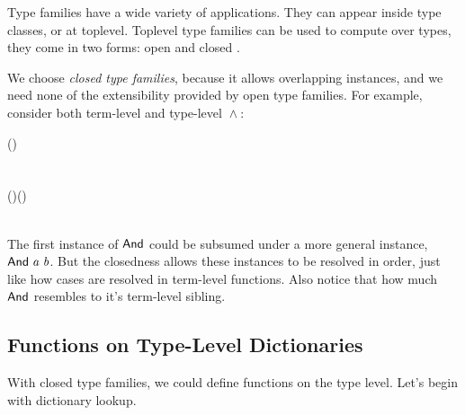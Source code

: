 Type families have a wide variety of applications. They can appear inside type
 classes\cite{tfclass,tfsynonym}, or at toplevel. Toplevel type families
 can be used to compute over types, they come in two forms: open\cite{tfopen}
 and closed \cite{tfclosed}.

We choose \emph{closed type families}, because it allows overlapping instances,
 and we need none of the extensibility provided by open type families.
For example, consider both term-level and type-level \ensuremath{\mathrel{\wedge}}:

\begin{hscode}\SaveRestoreHook
{}%
%
%
%
%
%
\>[B]{}(\mathrel{\wedge})\mathbin{::}\to {}\to {}\<[E]%
\\
\>[B]{}\mathrel{\wedge}\mathrel{=}\<[E]%
\\
\>[B]{}\<[6]%
\>[6]{}\mathrel{\wedge}\<[14]%
\>[14]{}\mathrel{=}\<[E]%
\\[\blanklineskip]%
\>[B]{}\;\;\;(\mathbin{::})\;(\mathbin{::})\mathbin{::}\;\<[E]%
\\
\>[B]{}\<[5]%
\>[5]{}\;\;\mathrel{=}\<[E]%
\\
\>[B]{}\<[5]%
\>[5]{}\;\;{}\<[14]%
\>[14]{}\<[19]%
\>[19]{}\mathrel{=}\<[E]%
\ColumnHook
\end{hscode}\resethooks

The first instance of \ensuremath{\Conid{And}} could be subsumed under a more
 general instance, \ensuremath{\Conid{And}\;\Varid{a}\;\Varid{b}}.
But the closedness allows these instances to be resolved in order, just like
 how cases are resolved in term-level functions. Also notice that how much
 \ensuremath{\Conid{And}} resembles to it's term-level sibling.

\subsection{Functions on Type-Level Dictionaries}

With closed type families, we could define functions on the type level.
 Let's begin with dictionary lookup.

